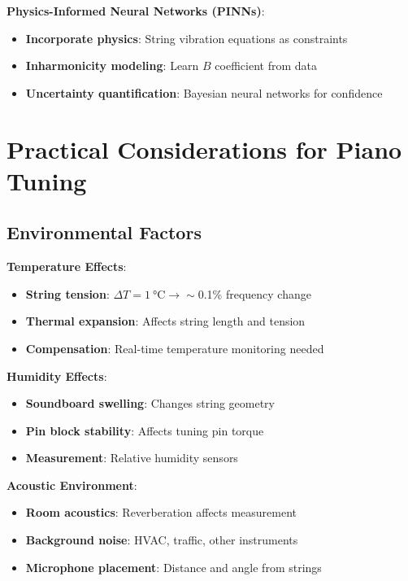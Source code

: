 \documentclass[11pt,a4paper]{article}
\begin{document}
\textbf{Physics-Informed Neural Networks (PINNs)}:
\begin{itemize}
    \item \textbf{Incorporate physics}: String vibration equations as constraints
    \item \textbf{Inharmonicity modeling}: Learn $B$ coefficient from data
    \item \textbf{Uncertainty quantification}: Bayesian neural networks for confidence
\end{itemize}

\section{Practical Considerations for Piano Tuning}

\subsection{Environmental Factors}

\textbf{Temperature Effects}:
\begin{itemize}
    \item \textbf{String tension}: $\Delta T = \SI{1}{\celsius} \rightarrow \sim$0.1\% frequency change
    \item \textbf{Thermal expansion}: Affects string length and tension
    \item \textbf{Compensation}: Real-time temperature monitoring needed
\end{itemize}

\textbf{Humidity Effects}:
\begin{itemize}
    \item \textbf{Soundboard swelling}: Changes string geometry
    \item \textbf{Pin block stability}: Affects tuning pin torque
    \item \textbf{Measurement}: Relative humidity sensors
\end{itemize}

\textbf{Acoustic Environment}:
\begin{itemize}
    \item \textbf{Room acoustics}: Reverberation affects measurement
    \item \textbf{Background noise}: HVAC, traffic, other instruments
    \item \textbf{Microphone placement}: Distance and angle from strings
\end{itemize}
\end{document}
